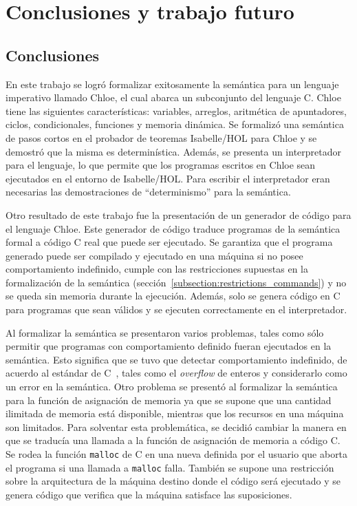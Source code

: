 \chapter{Conclusiones y trabajo futuro}\label{chapter:conclusion}

\section{Conclusiones}

En este trabajo se logró formalizar exitosamente la semántica para un lenguaje imperativo llamado Chloe, el cual abarca un subconjunto del lenguaje C.
Chloe tiene las siguientes características: variables, arreglos, aritmética de apuntadores, ciclos, condicionales, funciones y memoria dinámica.
Se formalizó una semántica de pasos cortos en el probador de teoremas Isabelle/HOL para Chloe y se demostró que la misma es determinística.
Además, se presenta un interpretador para el lenguaje, lo que permite que los programas escritos en Chloe sean ejecutados en el entorno de Isabelle/HOL.
Para escribir el interpretador eran necesarias las demostraciones de ``determinismo'' para la semántica.

Otro resultado de este trabajo fue la presentación de un generador de código para el lenguaje Chloe.
Este generador de código traduce programas de la semántica formal a código C real que puede ser ejecutado.
Se garantiza que el programa generado puede ser compilado y ejecutado en una máquina si no posee comportamiento indefinido, cumple con las restricciones supuestas en la formalización de la semántica (sección~\ref{subsection:restrictions_commands}) y no se queda sin memoria durante la ejecución.
Además, solo se genera código en C para programas que sean válidos y se ejecuten correctamente en el interpretador.

Al formalizar la semántica se presentaron varios problemas, tales como sólo permitir que programas con comportamiento definido fueran ejecutados en la semántica.
Esto significa que se tuvo que detectar comportamiento indefinido, de acuerdo al estándar de C~\cite{c99}, tales como el \textit{overflow} de enteros y considerarlo como un error en la semántica.
Otro problema se presentó al formalizar la semántica para la función de asignación de memoria ya que se supone que una cantidad ilimitada de memoria está disponible, mientras que los recursos en una máquina son limitados.
Para solventar esta problemática, se decidió cambiar la manera en que se traducía una llamada a la función de asignación de memoria a código C.
Se rodea la función \verb|malloc| de C en una nueva definida por el usuario que aborta el programa si una llamada a \verb|malloc| falla.
También se supone una restricción sobre la arquitectura de la máquina destino donde el código será ejecutado y se genera código que verifica que la máquina satisface las suposiciones.


